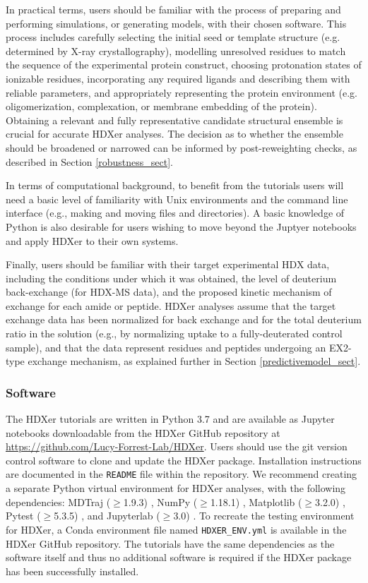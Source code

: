 \documentclass[9pt,tutorial,ASAPversion]{livecoms}
\begin{document}
In practical terms, users should be familiar with the process of preparing and performing simulations, or generating models, with their chosen software.   
This process includes carefully selecting the initial seed or template structure (e.g. determined by X-ray crystallography), modelling unresolved residues to match the sequence of the experimental protein construct, choosing protonation states of ionizable residues, incorporating any required ligands and describing them with reliable parameters, and appropriately representing the protein environment (e.g. oligomerization, complexation, or membrane embedding of the protein).
Obtaining a relevant and fully representative candidate structural ensemble is crucial for accurate HDXer analyses.
The decision as to whether the ensemble should be broadened or narrowed can be informed by post-reweighting checks, as described in Section \ref{robustness_sect}.

In terms of computational background, to benefit from the tutorials users will need a basic level of familiarity with Unix environments and the command line interface (e.g., making and moving files and directories).
A basic knowledge of Python is also desirable for users wishing to move beyond the Juptyer notebooks and apply HDXer to their own systems. 

Finally, users should be familiar with their target experimental HDX data, including the conditions under which it was obtained, the level of deuterium back-exchange (for HDX-MS data), and the proposed kinetic mechanism of exchange for each amide or peptide.
HDXer analyses assume that the target exchange data has been normalized for back exchange and for the total deuterium ratio in the solution (e.g., by normalizing uptake to a fully-deuterated control sample), and that the data represent residues and peptides undergoing an EX2-type exchange mechanism, as explained further in Section \ref{predictivemodel_sect}.

\subsubsection{Software}\label{Software_sect}
The HDXer tutorials are written in Python 3.7 and are available as Jupyter notebooks downloadable from the HDXer GitHub repository at \url{https://github.com/Lucy-Forrest-Lab/HDXer}.
Users should use the git version control software to clone and update the HDXer package. Installation instructions are documented in the \texttt{README} file within the repository.
We recommend creating a separate Python virtual environment for HDXer analyses, with the following dependencies: MDTraj ($\geqslant$1.9.3) \cite{McGibbon2015MDTraj}, NumPy ($\geqslant$1.18.1) \cite{Harris2020}, Matplotlib ($\geqslant$3.2.0) \cite{Hunter:2007}, Pytest ($\geqslant$5.3.5) \cite{pytest5.3}, and Jupyterlab ($\geqslant$3.0) \cite{project_jupyter}.
To recreate the testing environment for HDXer, a Conda environment file named \texttt{HDXER\_ENV.yml} is available in the HDXer GitHub repository.
The tutorials have the same dependencies as the software itself and thus  no additional software is required if the HDXer package has been successfully installed.
\end{document}
